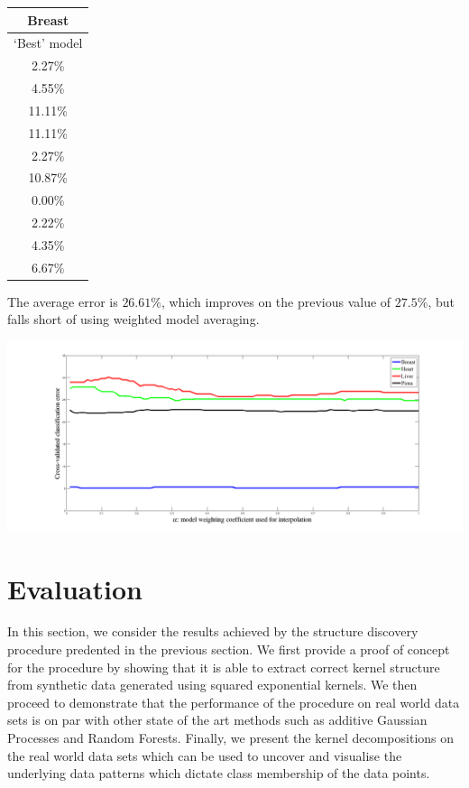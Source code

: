 \documentclass[a4paper,12pt ]{report}
\begin{document}
\begin{table}[h]

  \begin{tabular}{|c | }
      \hline
      \multicolumn{1}{|c|}{Breast}  \\
      \hline
       `Best' model \\  \hline
2.27\% \\
4.55\%\\
11.11\%\\
11.11\%\\
2.27\%\\
10.87\%\\
0.00\%\\
2.22\%\\
4.35\%\\
6.67\%\\

      \hline 
      \end{tabular}
\end{table}



   
   The average error is $26.61 \%$, which improves on the previous value of $27.5\%$, but falls short of using weighted model averaging. 

   \includegraphics[trim=8cm 5cm 8cm 6cm, width=\textwidth]{figures/alphaBMA.png}%


\clearpage


\chapter{Evaluation} 

In this section, we consider the results achieved by the structure discovery procedure predented in the previous section. We first provide a proof of concept for the procedure by showing that it is able to extract correct kernel structure from synthetic data generated using squared
exponential kernels. We then proceed to demonstrate that the performance of the procedure on real world data sets is on par with other state of the art methods such as additive Gaussian Processes and Random Forests. Finally, we present the kernel decompositions on the real
world data sets which can be used to uncover and visualise the underlying data patterns which dictate class membership of the data points. 
\end{document}
